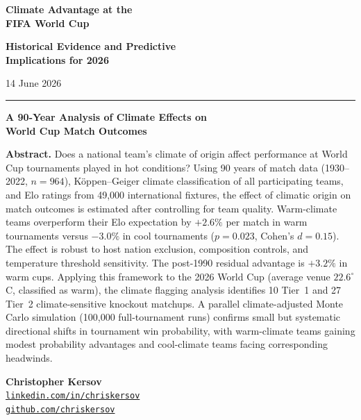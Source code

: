 \documentclass[11pt,a4paper]{article}
\begin{document}

\begin{titlepage}
    \centering
    \vspace*{1.5cm}
    
    {\Huge\bfseries Climate Advantage at the\\ FIFA World Cup}
    
    \vspace{0.4cm}
    {\Large\bfseries Historical Evidence and Predictive\\ Implications for 2026}
    
    \vspace{0.4cm}
    {\large 14 June 2026}
    
    \vspace{0.8cm}
    {\rule{0.6\linewidth}{1.5pt}}
    \vspace{0.8cm}
    
    {\Large\bfseries A 90-Year Analysis of Climate Effects on\\ World Cup Match Outcomes}
    
    \vfill
    
    \begin{minipage}{0.85\linewidth}
        \small
        \textbf{Abstract.}\;
        Does a national team's climate of origin affect performance at World Cup tournaments played in hot conditions? Using 90 years of match data (1930--2022, $n=964$), K\"{o}ppen--Geiger climate classification of all participating teams, and Elo ratings from 49,000 international fixtures, the effect of climatic origin on match outcomes is estimated after controlling for team quality. Warm-climate teams overperform their Elo expectation by $+2.6\%$ per match in warm tournaments versus $-3.0\%$ in cool tournaments ($p=0.023$, Cohen's $d=0.15$). The effect is robust to host nation exclusion, composition controls, and temperature threshold sensitivity. The post-1990 residual advantage is $+3.2\%$ in warm cups. Applying this framework to the 2026 World Cup (average venue $22.6^{\circ}$C, classified as warm), the climate flagging analysis identifies 10 Tier~1 and 27 Tier~2 climate-sensitive knockout matchups. A parallel climate-adjusted Monte Carlo simulation (100,000 full-tournament runs) confirms small but systematic directional shifts in tournament win probability, with warm-climate teams gaining modest probability advantages and cool-climate teams facing corresponding headwinds.
    \end{minipage}
    
    \vfill
    
    {\large\bfseries Christopher Kersov}\\[0.3cm]
    \small
    \textcolor{medgray}{\href{https://www.linkedin.com/in/chriskersov/}{\texttt{linkedin.com/in/chriskersov}}}\\[0.15cm]
    \textcolor{medgray}{\href{https://github.com/chriskersov}{\texttt{github.com/chriskersov}}}
    
    \vfill
    
    \vspace{1cm}
\end{titlepage}
\end{document}
